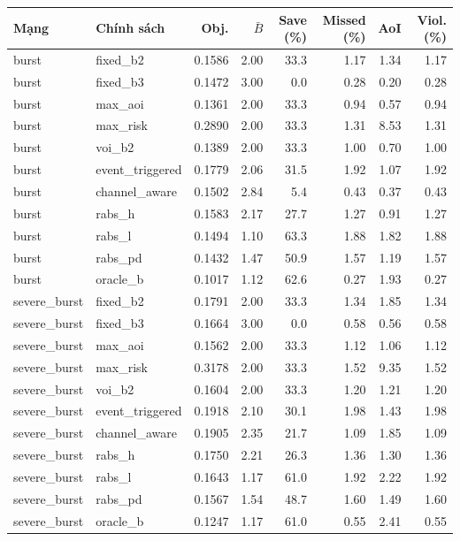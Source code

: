 \begin{tabular}{llrrrrrr}
\toprule
Mạng & Chính sách & Obj. & $\bar{B}$ & Save (\%) & Missed (\%) & AoI & Viol. (\%) \\
\midrule
burst & fixed\_b2 & 0.1586 & 2.00 & 33.3 & 1.17 & 1.34 & 1.17 \\
burst & fixed\_b3 & 0.1472 & 3.00 & 0.0 & 0.28 & 0.20 & 0.28 \\
burst & max\_aoi & 0.1361 & 2.00 & 33.3 & 0.94 & 0.57 & 0.94 \\
burst & max\_risk & 0.2890 & 2.00 & 33.3 & 1.31 & 8.53 & 1.31 \\
burst & voi\_b2 & 0.1389 & 2.00 & 33.3 & 1.00 & 0.70 & 1.00 \\
burst & event\_triggered & 0.1779 & 2.06 & 31.5 & 1.92 & 1.07 & 1.92 \\
burst & channel\_aware & 0.1502 & 2.84 & 5.4 & 0.43 & 0.37 & 0.43 \\
burst & rabs\_h & 0.1583 & 2.17 & 27.7 & 1.27 & 0.91 & 1.27 \\
burst & rabs\_l & 0.1494 & 1.10 & 63.3 & 1.88 & 1.82 & 1.88 \\
burst & rabs\_pd & 0.1432 & 1.47 & 50.9 & 1.57 & 1.19 & 1.57 \\
burst & oracle\_b & 0.1017 & 1.12 & 62.6 & 0.27 & 1.93 & 0.27 \\
severe\_burst & fixed\_b2 & 0.1791 & 2.00 & 33.3 & 1.34 & 1.85 & 1.34 \\
severe\_burst & fixed\_b3 & 0.1664 & 3.00 & 0.0 & 0.58 & 0.56 & 0.58 \\
severe\_burst & max\_aoi & 0.1562 & 2.00 & 33.3 & 1.12 & 1.06 & 1.12 \\
severe\_burst & max\_risk & 0.3178 & 2.00 & 33.3 & 1.52 & 9.35 & 1.52 \\
severe\_burst & voi\_b2 & 0.1604 & 2.00 & 33.3 & 1.20 & 1.21 & 1.20 \\
severe\_burst & event\_triggered & 0.1918 & 2.10 & 30.1 & 1.98 & 1.43 & 1.98 \\
severe\_burst & channel\_aware & 0.1905 & 2.35 & 21.7 & 1.09 & 1.85 & 1.09 \\
severe\_burst & rabs\_h & 0.1750 & 2.21 & 26.3 & 1.36 & 1.30 & 1.36 \\
severe\_burst & rabs\_l & 0.1643 & 1.17 & 61.0 & 1.92 & 2.22 & 1.92 \\
severe\_burst & rabs\_pd & 0.1567 & 1.54 & 48.7 & 1.60 & 1.49 & 1.60 \\
severe\_burst & oracle\_b & 0.1247 & 1.17 & 61.0 & 0.55 & 2.41 & 0.55 \\
\bottomrule
\end{tabular}
